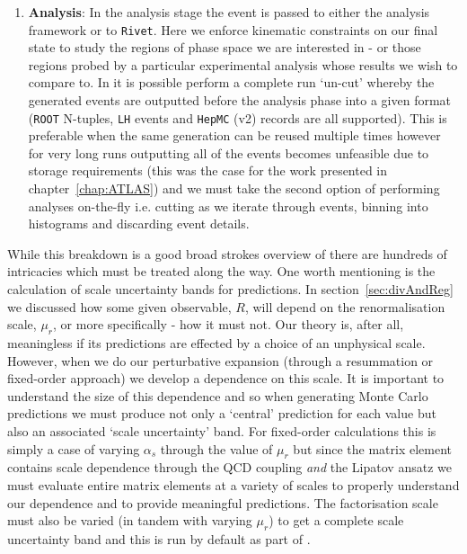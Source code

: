 \begin{enumerate}
			\item \textbf{Analysis}: In the analysis stage the event is passed to either
			the \HEJ analysis framework or to \texttt{Rivet}.
			Here we enforce kinematic constraints on our final state to study the regions of
			phase space we are interested in - or those regions probed by a particular
			experimental analysis whose results we wish to compare to.  In \HEJ it is possible
			perform a complete run `un-cut' whereby the generated events are outputted before
			the analysis phase into a given format (\texttt{ROOT} N-tuples, \texttt{LH} events
			and \texttt{HepMC} (v2) records are all supported).  This is preferable when the same
			generation can be reused multiple times however for very long runs outputting all of the
			events becomes unfeasible due to storage requirements (this was the case for the work
			presented in chapter~\ref{chap:ATLAS}) and we must take the second option of performing
			\HEJ analyses on-the-fly i.e. cutting as we iterate through events, binning into
			histograms and discarding event details.
		\end{enumerate}

		While this breakdown is a good broad strokes overview of \HEJ there are hundreds of intricacies
		which must be treated along the way.  One worth mentioning is the calculation of scale uncertainty
		bands for predictions.  In section~\eqref{sec:divAndReg} we discussed how some given observable, $R$,
		will depend on the renormalisation scale, $\mu_r$, or more specifically - how it must not.  Our theory
		is, after all, meaningless if its predictions are effected by a choice of an unphysical scale.  However,
		when we do our perturbative expansion (through a resummation or fixed-order approach) we develop a
		dependence on this scale.  It is important to understand the size of this dependence and so when
		generating Monte Carlo predictions we must produce not only a `central' prediction for each value but
		also an associated `scale uncertainty' band.  For fixed-order calculations this is simply a case of
		varying $\alpha_s$ through the value of $\mu_r$ but since the \hej matrix element contains scale
		dependence through the QCD coupling \emph{and} the Lipatov ansatz we must evaluate entire matrix elements
		at a variety of scales to properly understand our dependence and to provide meaningful predictions.  The
		factorisation scale must also be varied (in tandem with varying $\mu_r$) to get a complete
		scale uncertainty band and this is run by default as part of \HEJ.


